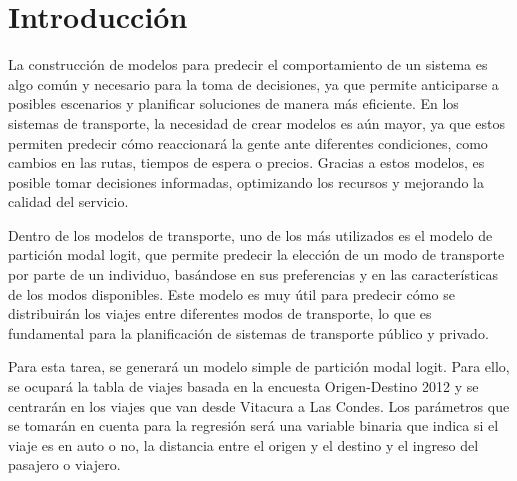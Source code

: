 \section{Introducción}

La construcción de modelos para predecir el comportamiento de un sistema es algo común y necesario para la toma de decisiones, ya que permite anticiparse a posibles escenarios y planificar soluciones de manera más eficiente. En los sistemas de transporte, la necesidad de crear modelos es aún mayor, ya que estos permiten predecir cómo reaccionará la gente ante diferentes condiciones, como cambios en las rutas, tiempos de espera o precios. Gracias a estos modelos, es posible tomar decisiones informadas, optimizando los recursos y mejorando la calidad del servicio. 

Dentro de los modelos de transporte, uno de los más utilizados es el modelo de partición modal logit, que permite predecir la elección de un modo de transporte por parte de un individuo, basándose en sus preferencias y en las características de los modos disponibles. Este modelo es muy útil para predecir cómo se distribuirán los viajes entre diferentes modos de transporte, lo que es fundamental para la planificación de sistemas de transporte público y privado.

Para esta tarea, se generará un modelo simple de partición modal logit. Para ello, se ocupará la tabla de viajes basada en la encuesta Origen-Destino 2012 y se centrarán en los viajes que van desde Vitacura a Las Condes. Los parámetros que se tomarán en cuenta para la regresión será una variable binaria que indica si el viaje es en auto o no, la distancia entre el origen y el destino y el ingreso del pasajero o viajero.